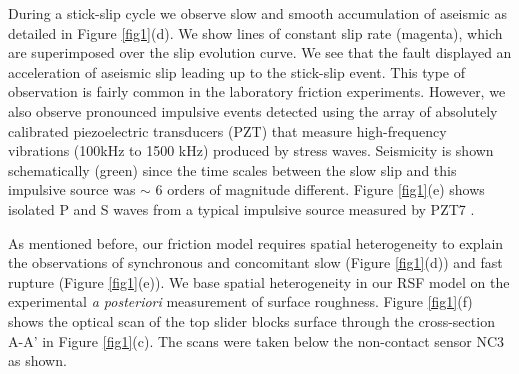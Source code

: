 \documentclass[preprint,1p, 10pt,authoryear]{elsarticle}
\begin{document}
During a stick-slip cycle we observe slow and smooth accumulation of aseismic as detailed in Figure \ref{fig1}(d). We show lines of constant slip rate (magenta), which are superimposed over the slip evolution curve.  We see that the fault displayed an acceleration of aseismic slip leading up to the stick-slip event. This type of observation is fairly common in the laboratory friction experiments. However, we also observe pronounced impulsive events detected using the array of absolutely calibrated piezoelectric transducers (PZT) that measure high-frequency vibrations (100kHz to 1500 kHz) produced by stress waves. Seismicity is shown schematically (green) since the time scales between the slow slip and this impulsive source was $\sim$ 6 orders of magnitude different.  Figure \ref{fig1}(e) shows isolated P and S waves from a typical impulsive source measured by PZT7  \citep{Selvadurai2019}.
 
As mentioned before, our friction model requires spatial heterogeneity to explain the observations of synchronous and concomitant slow (Figure \ref{fig1}(d)) and fast rupture (Figure \ref{fig1}(e)). We base spatial heterogeneity in our RSF model on the experimental \textit{a posteriori} measurement of surface roughness. Figure \ref{fig1}(f) shows the optical scan of the top slider blocks surface through the cross-section A-A' in Figure \ref{fig1}(c).  The scans were taken below the non-contact sensor NC3 as shown.
\end{document}
